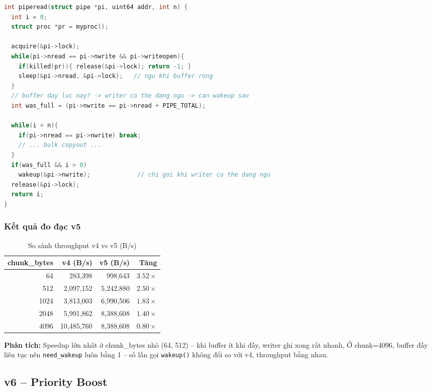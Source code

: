 \documentclass[12pt,a4paper]{article}
\newcommand{\code}[1]{\texttt{#1}}
\begin{document}
\begin{lstlisting}[caption={v5 -- piperead: lazy wakeup qua biến was\_full
    (kernel/pipe.c:678)}, language=C]
int piperead(struct pipe *pi, uint64 addr, int n) {
  int i = 0;
  struct proc *pr = myproc();

  acquire(&pi->lock);
  while(pi->nread == pi->nwrite && pi->writeopen){
    if(killed(pr)){ release(&pi->lock); return -1; }
    sleep(&pi->nread, &pi->lock);   // ngu khi buffer rong
  }
  // buffer day luc nay? -> writer co the dang ngu -> can wakeup sau
  int was_full = (pi->nwrite == pi->nread + PIPE_TOTAL);

  while(i < n){
    if(pi->nread == pi->nwrite) break;
    // ... bulk copyout ...
  }
  if(was_full && i > 0)
    wakeup(&pi->nwrite);             // chi goi khi writer co the dang ngu
  release(&pi->lock);
  return i;
}
\end{lstlisting}

\subsubsection{Kết quả đo đạc v5}
\begin{table}[H]
\centering
\caption{So sánh throughput v4 vs v5 (B/s)}
\begin{tabular}{rrrr}
\toprule
\textbf{chunk\_bytes} & \textbf{v4 (B/s)} & \textbf{v5 (B/s)} & \textbf{Tăng} \\
\midrule
64   & 283,398    & 998,643   & $3.52\times$ \\
512  & 2,097,152  & 5,242,880 & $2.50\times$ \\
1024 & 3,813,003  & 6,990,506 & $1.83\times$ \\
2048 & 5,991,862  & 8,388,608 & $1.40\times$ \\
4096 & 10,485,760 & 8,388,608 & $0.80\times$ \\
\bottomrule
\end{tabular}
\end{table}

\textbf{Phân tích:} Speedup lớn nhất ở chunk\_bytes nhỏ (64, 512) -- khi buffer ít khi
đầy, writer ghi xong rất nhanh, Ở chunk=4096, buffer đầy liên tục nên
\code{need\_wakeup} luôn bằng 1 -- số lần gọi \code{wakeup()} không đổi so với v4,
throughput bằng nhau.

\subsection{v6 -- Priority Boost}
\end{document}
